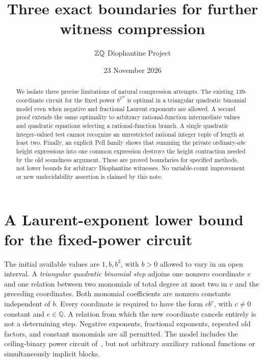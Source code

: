 \documentclass[11pt]{article}
\title{Three exact boundaries for further witness compression}
\author{\(\Z\Q\) Diophantine Project}
\date{23 November 2026}
\newcommand{\Q}{\mathbb Q}\newcommand{\Z}{\mathbb Z}
\begin{document}
\maketitle
\begin{abstract}
We isolate three precise limitations of natural compression attempts.
The existing 139-coordinate circuit for the fixed power $b^{5^{60}}$
is optimal in a triangular quadratic binomial model even when negative
and fractional Laurent exponents are allowed. A second proof extends
the same optimality to arbitrary rational-function intermediate values
and quadratic equations selecting a rational-function branch. A single quadratic
integer-valued test cannot recognize an unrestricted rational integer
tuple of length at least two. Finally, an explicit Pell family shows
that summing the private ordinary-$abc$ height expressions into one
common expression destroys the height contraction needed by the old
soundness argument. These are proved boundaries for specified methods,
not lower bounds for arbitrary Diophantine witnesses. No variable-count
improvement or new undecidability assertion is claimed by this note.
\end{abstract}

\section{A Laurent-exponent lower bound for the fixed-power circuit}

The initial available values are $1,b,b^2$, with $b>0$ allowed to vary
in an open interval. A \emph{triangular quadratic binomial step} adjoins
one nonzero coordinate $v$ and one relation between two monomials of
total degree at most two in $v$ and the preceding coordinates. Both
monomial coefficients are nonzero constants independent of $b$.
Every coordinate is required to have the form $c b^e$, with $c\ne0$
constant and $e\in\Q$. A relation from which the new coordinate
cancels entirely is not a determining step. Negative exponents,
fractional exponents, repeated old factors, and constant monomials are
all permitted. The model includes the ceiling-binary power circuit
of~\cite{ceiling}, but not arbitrary auxiliary rational functions or
simultaneously implicit blocks.
\end{document}
